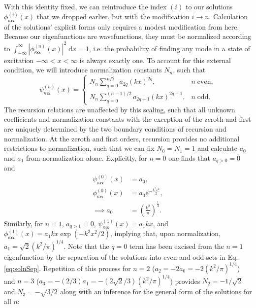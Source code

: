 \documentclass{article}
\numberwithin{equation}{section}
\begin{document}
With this identity fixed, we can reintroduce the index $(i)$ to our solutions $\phi_{\kappa\bm{\alpha}}^{(i)}(x)$ that we dropped earlier, but with the modification $i\to n$. Calculation of the solutions' explicit forms only requires a modest modification from here. Because our eigenfunctions are wavefunctions, they must be normalized according to $\int_{-\infty}^\infty|\phi_{\kappa\bm{\alpha}}^{(n)}(x)|^2\;\mathrm{d}x = 1$, i.e. the probability of finding any mode in a state of excitation $-\infty<x<\infty$ is always exactly one. To account for this external condition, we will introduce normalization constants $N_n$, such that
\begin{equation}\label{eq:solnSep}
\psi_{\kappa\bm{\alpha}}^{(n)}(x) = 
\begin{cases}
N_n\sum_{q = 0}^{n/2}a_{2q}(kx)^{2q},& n\;\mathrm{even},\\[0.5em]
N_n\sum_{q = 0}^{(n-1)/2}a_{2q+1}(kx)^{2q+1},& n\;\mathrm{odd}.
\end{cases}
\end{equation}
The recursion relations are unaffected by this scaling, such that all unknown coefficients and normalization constants with the exception of the zeroth and first are uniquely determined by the two boundary conditions of recursion and normalization. At the zeroth and first orders, recursion provides no additional restrictions to normalization, such that we can fix $N_0 = N_1 = 1$ and calculate $a_0$ and $a_1$ from normalization alone. Explicitly, for $n = 0$ one finds that $a_{q>0} = 0$ and
\begin{equation}
\begin{split}
\psi_{\kappa\bm{\alpha}}^{(0)}(x) &= a_0,\\
\phi_{\kappa\bm{\alpha}}^{(0)}(x) &= a_0\mathrm{e}^{-\frac{k^2x^2}{2}},\\
\implies a_0 &= \left(\frac{k^2}{\pi}\right)^{\frac{1}{4}}.
\end{split}
\end{equation}
Similarly, for $n = 1$, $a_{q>1} = 0$, $\psi_{\kappa\bm{\alpha}}^{(1)}(x) = a_1kx$, and $\phi_{\kappa\bm{\alpha}}^{(1)}(x) = a_1kx\exp(-k^2x^2/2)$, implying that, upon normalization, $a_1 = \sqrt{2}(k^2/\pi)^{1/4}$. Note that the $q = 0$ term has been excised from the $n = 1$ eigenfunction by the separation of the solutions into even and odd sets in Eq. \eqref{eq:solnSep}. Repetition of this process for $n = 2$ ($a_2 = -2a_0 = -2(k^2/\pi)^{1/4}$) and $n = 3$ ($a_3 = -(2/3)a_1 = -(2\sqrt{2}/3)(k^2/\pi)^{1/4}$) provides $N_2 = -1/\sqrt{2}$ and $N_3 = -\sqrt{3/2}$ along with an inference for the general form of the solutions for all $n$:
\end{document}
